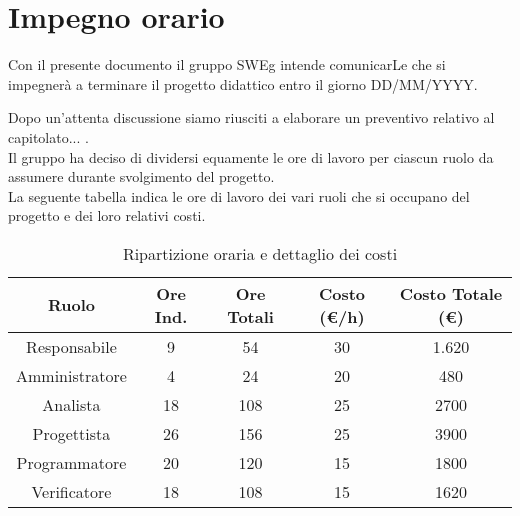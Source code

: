 \section{Impegno orario}

Con il presente documento il gruppo SWEg intende comunicarLe che si impegner\`a a terminare il progetto didattico entro il giorno DD/MM/YYYY.

Dopo un'attenta discussione siamo riusciti a elaborare un preventivo relativo al capitolato... .\\
Il gruppo ha deciso di dividersi equamente le ore di lavoro per ciascun ruolo da assumere durante svolgimento del progetto.\\
La seguente tabella indica le ore di lavoro dei vari ruoli che si occupano del progetto e dei loro relativi costi.

\vspace{0.5cm}

\begin{table}[h]
    \centering
    \begin{tabular}{|c|c|c|c|c|}
        \hline
        \rowcolor[gray]{0.9}
        \textbf{Ruolo} & \textbf{Ore Ind.} & \textbf{Ore Totali} & \textbf{Costo (\euro/h)} & \textbf{Costo Totale (\euro)} \\
        \hline
        Responsabile & 9 & 54 & 30 & 1.620 \\
        \hline
        Amministratore & 4 & 24 & 20 & 480 \\
        \hline
        Analista & 18 & 108 & 25 & 2700 \\
        \hline
        Progettista & 26 & 156 & 25 & 3900 \\
        \hline
        Programmatore & 20 & 120 & 15 & 1800 \\
        \hline
        Verificatore & 18 & 108 & 15 & 1620 \\
        \hline
    \end{tabular}
\caption{Ripartizione oraria e dettaglio dei costi}
\end{table}
